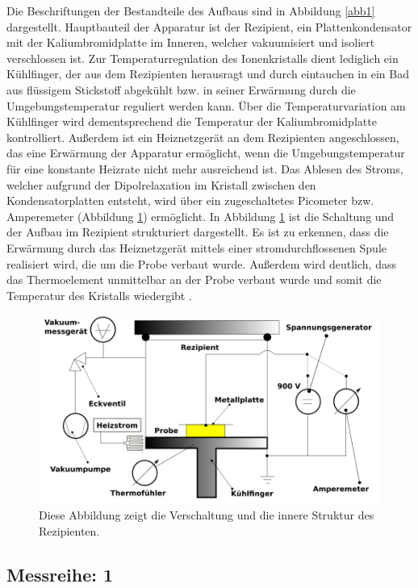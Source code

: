 Die Beschriftungen der Bestandteile des Aufbaus sind in Abbildung \ref{abb1} dargestellt.
Hauptbauteil der Apparatur ist der Rezipient, ein Plattenkondensator mit der Kaliumbromidplatte
im Inneren, welcher vakuumisiert und isoliert verschlossen ist. 
Zur Temperaturregulation des Ionenkristalls dient lediglich ein Kühlfinger, 
der aus dem Rezipienten herausragt und durch eintauchen in ein Bad aus flüssigem 
Stickstoff abgekühlt bzw. in seiner Erwärmung durch die Umgebungstemperatur reguliert 
werden kann. Über die Temperaturvariation am Kühlfinger wird dementsprechend die 
Temperatur der Kaliumbromidplatte kontrolliert. 
Außerdem ist ein Heiznetzgerät an dem Rezipienten angeschlossen, das eine Erwärmung 
der Apparatur ermöglicht, wenn die Umgebungstemperatur für eine konstante 
Heizrate nicht mehr ausreichend ist. 
Das Ablesen des Stroms, welcher aufgrund der Dipolrelaxation im Kristall zwischen 
den Kondensatorplatten entsteht, wird über ein zugeschaltetes Picometer 
bzw. Amperemeter (Abbildung \ref{abb2}) ermöglicht.
In Abbildung \ref{abb2} ist die Schaltung und der Aufbau im Rezipient strukturiert 
dargestellt. Es ist zu erkennen, dass die Erwärmung durch das Heiznetzgerät 
mittels einer stromdurchflossenen Spule realisiert wird, die um die Probe
verbaut wurde. Außerdem wird deutlich, dass das Thermoelement unmittelbar an 
der Probe verbaut wurde und somit die Temperatur des Kristalls wiedergibt \cite{sample}. 

\begin{figure}
    \centering
    \includegraphics[width=\textwidth, keepaspectratio]{figure/AufbauSkizze.png}
    \caption{Diese Abbildung zeigt die Verschaltung und die innere Struktur 
    des Rezipienten. 
    \cite{sample}}
    \label{abb2}
\end{figure}
\newpage

\subsection{Messreihe: 1}

